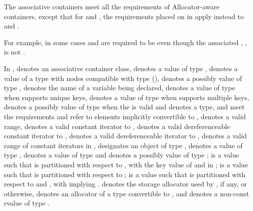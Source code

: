 \pnum
The associative containers meet all the requirements of Allocator-aware
containers, except that for
 and , the requirements placed on 
in  apply instead to 
and .
\begin{note}
For example, in some cases  and 
are required to be  even though the associated
, , is not
.
\end{note}

\pnum
In ,
 denotes an associative container class,
 denotes a value of type ,
 denotes a value of a type with nodes compatible with type
 (),
 denotes a possibly  value of type ,
 denotes the name of a variable being declared,
 denotes a value of type 
when  supports unique keys,
 denotes a value of type 
when  supports multiple keys,
 denotes a possibly  value of type 
when the 
 is valid
and denotes a type,
 and 
meet the  requirements and refer to elements
implicitly convertible to
, 
denotes a valid range,
 denotes a valid constant iterator to ,
 denotes a valid dereferenceable constant iterator to ,
 denotes a valid dereferenceable iterator to ,
 denotes a valid range of constant iterators in ,
 designates an object of type ,
 denotes a value of type ,
 denotes a value of type 
and  denotes a possibly  value of type ;
 is a value such that  is partitioned
with respect to , with  the key value of 
and  in ;
 is a value such that  is partitioned with respect to
;
 is a value such that  is partitioned with respect to
 and , with  implying
.
 denotes the storage allocator used by , if any, or  otherwise,
 denotes an allocator of a type convertible to ,
and  denotes a non-const rvalue of type .

